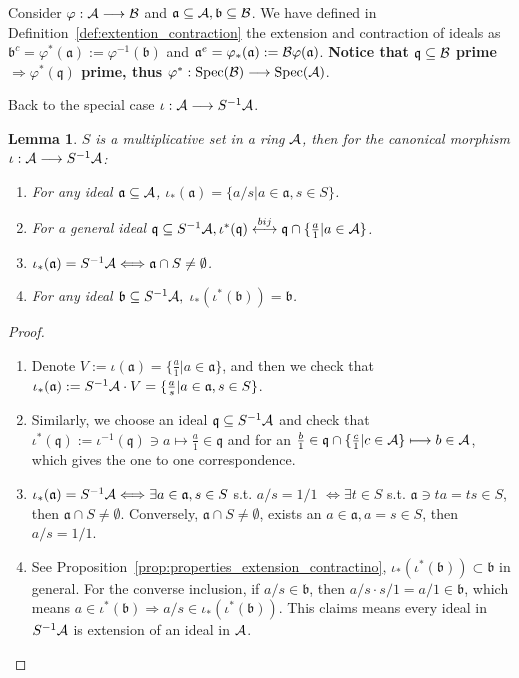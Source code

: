 \documentclass[11pt]{article}
\newtheorem{lemma}[thm]{Lemma}
\newcommand{\sca}{{\mathfrak a}}
\newcommand{\scb}{{\mathfrak b}}
\newcommand{\scq}{\mathfrak q}
\newcommand{\cala}{{\cal A}}
\newcommand{\calb}{{\cal B}}
\newcommand{\Lrta}{\Longrightarrow}
\newcommand{\lrta}{\longrightarrow}
\newcommand{\llrta}{\longleftrightarrow}
\newcommand{\Llrta}{\Longleftrightarrow}
\begin{document}
Consider $\varphi:\cala\lrta\calb$ and $\sca\subseteq \cala, \scb\subseteq \calb$. We have defined in Definition~\ref{def:extention_contraction} the extension and contraction of ideals as $\scb^{c}=\varphi^{*}(\sca):=\varphi^{-1}(\scb)$ and $\sca^{e}=\varphi_*(\sca):=\calb\varphi(\sca)$. \textbf{Notice that 
$\scq\subseteq \calb$ prime $\Lrta \varphi^{*}(\scq)$ prime,
thus $\varphi^*:\text{Spec}(\calb)\lrta \text{Spec}(\cala)$}.

Back to the special case $\iota :\cala\lrta S^{-1}\cala$.
\begin{lemma}\label{lem:prep_localization_iso}
$S$ is a multiplicative set in a ring $\cala$, then for the canonical morphism $\iota:\cala\lrta S^{-1}\cala$:
\begin{enumerate}[label=(\alph*)]
\item For any ideal $\sca\subseteq \cala$, $\iota_*(\sca)=\{a/s|a\in\sca,s\in S\}$.
\item {\color{red} For a general ideal $ \scq\subseteq S^{-1}\cala,\iota^*(\scq)\overset{bij}{\llrta}\scq\cap \{\frac{a}{1}|a\in\cala\}$}.
\item $\iota_*(\sca)= S^{-1}\cala\Llrta\sca\cap S\neq \emptyset$.
\item For any ideal $\scb\subseteq S^{-1}\cala,$ $\iota_{*}(\iota^*(\scb))=\scb$.
\end{enumerate}
\end{lemma}
\begin{proof}\ 
\begin{enumerate}[label=(\alph*)]
\item 
 Denote $V:=\iota(\sca)=\{\frac{a}{1}|a\in\sca\}$, and then we check that $\iota_*(\sca):=S^{-1}\cala\cdot V=\{\frac{a}{s}|a\in\sca,s\in S\}$. 
\item 
 Similarly, we choose an ideal $\scq\subseteq S^{-1}\cala$ and check that $\iota^*(\scq):=\iota^{-1}(\scq)\ni a\longmapsto \frac{a}{1}\in\scq$ and for an $\frac{b}{1}\in\scq\cap\{\frac{c}{1}|c\in\cala\}\longmapsto b\in\cala$, which gives the one to one correspondence.
\item
 $\iota_*(\sca)=S^{-1}\cala\Llrta \exists a\in \sca, s\in S$ s.t. $a/s=1/1$
$\Llrta\exists t\in S$ s.t. $\sca\ni ta=ts\in S$, then $\sca\cap S\neq\emptyset$. Conversely, $\sca\cap S\neq \emptyset$, exists an $a\in \sca, a=s\in S$, then $a/s=1/1$. 
\item 
See Proposition~\ref{prop:properties_extension_contractino}, $\iota_*(\iota^*(\scb))\subset \scb$ in general. For the converse inclusion, if $a/s\in \scb$, then $a/s\cdot s/1=a/1\in\scb$, which means $a\in \iota^{*}(\scb)\Lrta a/s\in \iota_{*}(\iota^*(\scb))$. This claims means every ideal in $S^{-1}\cala$ is extension of an ideal in $\cala$. 
\end{enumerate} 
\end{proof}
\end{document}
